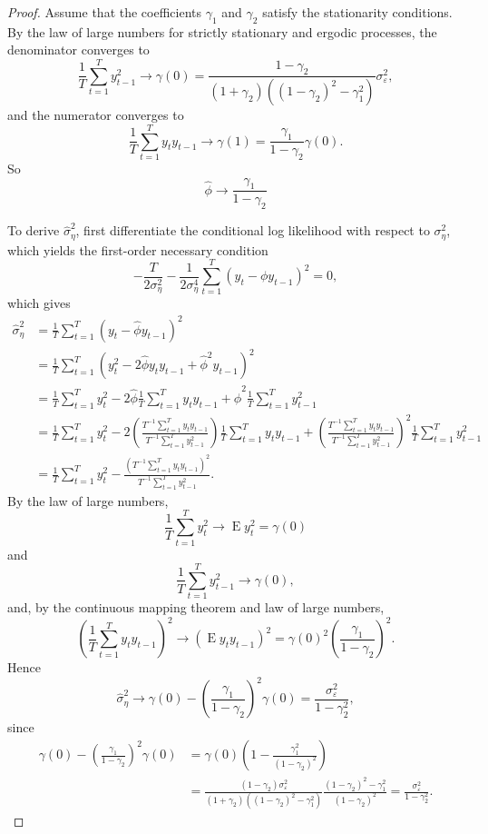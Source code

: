 \documentclass[oneside,reqno]{amsart}
\DeclareMathOperator{\E}{E}
\newcommand{\eps}{\varepsilon}
\theoremstyle{definition}
\begin{document}
\begin{enumerate}
\begin{proof}
Assume that the coefficients $\gamma_1$ and $\gamma_2$ satisfy the stationarity conditions. By the law of large numbers for strictly stationary and ergodic processes, the denominator converges to 
\[
	\frac{1}{T} \sum_{t=1}^Ty_{t-1}^2 \to  \gamma(0) = \frac{1-\gamma_2}{(1 + \gamma_2)((1-\gamma_2)^2 - \gamma_1^2)}\sigma_\eps^2,
\]
and the numerator converges to
\[
	\frac{1}{T}\sum_{t=1}^T y_t y_{t-1} \to \gamma(1) = \frac{\gamma_1}{1-\gamma_2}\gamma(0).
\]
So 
\[
	\hat \phi \to \frac{\gamma_1}{1-\gamma_2}
\]
\par
To derive $\hat \sigma_\eta^2$, first differentiate the conditional log likelihood with respect to $\sigma_\eta^2$, which yields the first-order necessary condition
\[
	-\frac{T}{2\sigma_\eta^2} - \frac{1}{2 \sigma_\eta^4} \sum_{t=1}^T (y_t- \phi y_{t-1})^2 = 0,
\]
which gives
\begin{align*}
	\hat \sigma_\eta^2 &= \frac{1}{T}\sum_{t=1}^T (y_t- \hat \phi y_{t-1})^2  \\
	&= \frac{1}{T}\sum_{t=1}^T (y_t^2- 2\hat \phi y_t y_{t-1} + \hat \phi^2 y_{t-1})^2 \\
	&= \frac{1}{T}\sum_{t=1}^T y_t^2- 2\hat \phi \frac{1}{T}\sum_{t=1}^T y_t y_{t-1} + \hat \phi^2 \frac{1}{T}\sum_{t=1}^T y_{t-1}^2 \\
	&= \frac{1}{T} \sum_{t=1}^T y_t^2 - 2 \left(\frac{T^{-1} \sum_{t=1}^T y_t y_{t-1}}{T^{-1} \sum_{t=1}^T y_{t-1}^2}\right)  \frac{1}{T}\sum_{t=1}^T y_t y_{t-1} + \left( \frac{T^{-1} \sum_{t=1}^T y_t y_{t-1}}{T^{-1} \sum_{t=1}^T y_{t-1}^2} \right)^2 \frac{1}{T}\sum_{t=1}^T y_{t-1}^2 \\
	&= \frac{1}{T} \sum_{t=1}^T y_t^2 - \frac{(T^{-1} \sum_{t=1}^T y_t y_{t-1})^2}{T^{-1} \sum_{t=1}^T y_{t-1}^2}. 
\end{align*}	
By the law of large numbers,
\[
	\frac{1}{T} \sum_{t=1}^T y_t^2 \to \E y_t^2 = \gamma(0)
\]
and
\[
	\frac{1}{T} \sum_{t=1}^T y_{t-1}^2 \to \gamma(0),
\]
and, by the continuous mapping theorem and law of large numbers,
\[
	\left(\frac{1}{T}\sum_{t=1}^T y_t y_{t-1} \right)^2 \to (\E y_ty_{t-1})^2 
	= \gamma(0)^2 \left(\frac{\gamma_1}{1 - \gamma_2}\right)^2.
\]
Hence
\[
	\hat \sigma_\eta^2 \to \gamma(0) -  \left(\frac{\gamma_1}{1 - \gamma_2}\right)^2\gamma(0) 
	= \frac{\sigma_\eps^2}{1-\gamma_2^2}, 
\]
since
\begin{align*}
	\gamma(0) -  \left(\frac{\gamma_1}{1 - \gamma_2}\right)^2\gamma(0) 
	&= \gamma(0) \left(1-\frac{\gamma_1^2}{(1 - \gamma_2)^2}\right) \\
	&= \frac{(1-\gamma_2)\sigma_\eps^2}{(1 + \gamma_2)((1-\gamma_2)^2 - \gamma_1^2)} \frac{(1-\gamma_2)^2- \gamma_1^2}{(1-\gamma_2)^2}  
	= \frac{\sigma_\eps^2}{1-\gamma_2^2}.
\end{align*}
\end{proof}
\end{enumerate}
\end{document}
